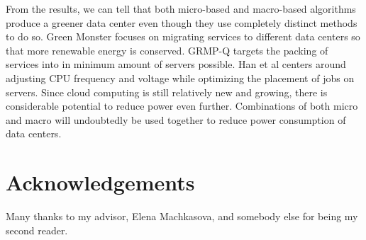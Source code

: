 \documentclass{sig-alternate}
\begin{document}
From the results, we can tell that both micro-based and macro-based algorithms produce a greener data center even though they use completely distinct methods to do so.  Green Monster focuses on migrating services to different data centers so that more renewable energy is conserved. GRMP-Q targets the packing of services into in minimum amount of servers possible. Han et al centers around adjusting CPU frequency and voltage while optimizing the placement of jobs on servers. Since cloud computing is still relatively new and growing, there is considerable potential to reduce power even further. Combinations of both micro and macro will undoubtedly be used together to reduce power consumption of data centers.

\section*{Acknowledgements}

Many thanks to my advisor, Elena Machkasova, and somebody else for being my second reader. 





\end{document}
